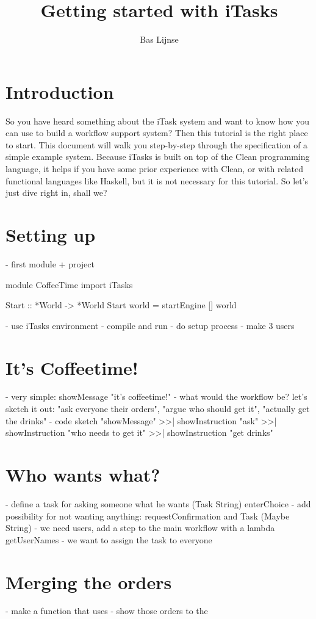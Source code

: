 \documentclass[a4paper,11pt]{article}
\title{Getting started with iTasks}
\author{Bas Lijnse}
\begin{document}
\maketitle
\section{Introduction}
So you have heard something about the iTask system and want to know how you can use to build a workflow support system? Then this tutorial is the right place to start. This document will walk you step-by-step through the specification of a simple example system. Because iTasks is built on top of the Clean programming language, it helps if you have some prior experience with Clean, or with related functional languages like Haskell, but it is not necessary for this tutorial. So let's just dive right in, shall we?
\section{Setting up}
- first module + project
\begin{CleanCodeN}
module CoffeeTime
import iTasks

Start :: *World -> *World
Start world = startEngine [] world
\end{CleanCodeN}
- use iTasks environment
- compile and run
- do setup process
- make 3 users
\section{It's Coffeetime!}
- very simple: showMessage "it's coffeetime!"
- what would the workflow be? let's sketch it out: "ask everyone their orders", "argue who should get it", "actually get the drinks"
- code sketch "showMessage" >>| showInstruction "ask" >>| showInstruction "who needs to get it" >>| showInstruction "get drinks"
\section{Who wants what?}
- define a task for asking someone what he wants (Task String)  enterChoice
- add possibility for not wanting anything: requestConfirmation and Task (Maybe String)
- we need users, add a step to the main workflow with a lambda getUserNames
- we want to assign the task to everyone 
\section{Merging the orders}
- make a function that uses
- show those orders to the
\end{document}
